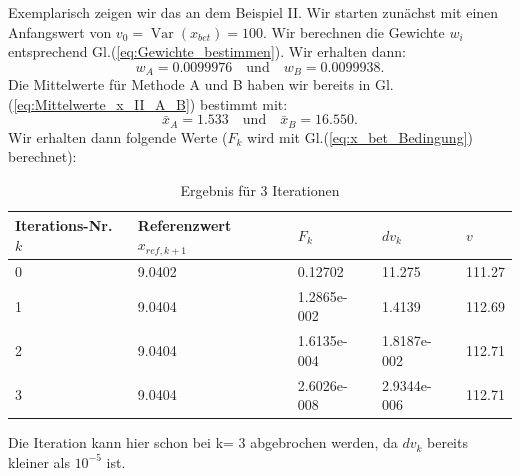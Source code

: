 Exemplarisch zeigen wir das an dem Beispiel II. 
Wir starten zunächst mit einen Anfangswert von $v_0 = \operatorname{Var}(x_{bet})=100$.
Wir berechnen die Gewichte $w_i$ entsprechend Gl.(\ref{eq:Gewichte_bestimmen}).
Wir erhalten dann:
\begin{equation}
w_A = 0.0099976 \quad \text{und} \quad w_B = 0.0099938.
\end{equation}
Die Mittelwerte für Methode A und B haben wir bereits in Gl.(\ref{eq:Mittelwerte_x_II_A_B}) bestimmt mit: 
\begin{equation}
\bar x_A = 1.533 \quad \text{und} \quad \bar x_B = 16.550.
\end{equation}
Wir erhalten dann folgende Werte ($F_k$ wird mit Gl.(\ref*{eq:x_bet_Bedingung}) berechnet):

\begin{table}[!htb]
	\caption{Ergebnis für 3 Iterationen}
	\begin{center}
		\begin{tabular}{p{2cm}| p{3.5cm} | p{3cm} |p{3cm}|p{2cm}}
			\hline 
			Iterations-Nr. $k$ & Referenzwert $x_{ref,k+1}$ & $F_{k}$ & $dv_k$ & $v$\\ \hline
			0 & 9.0402 & 0.12702 & 11.275 &  111.27\\ \hline
			1 & 9.0404 & 1.2865e-002 & 1.4139 & 112.69\\ \hline
			2 & 9.0404 & 1.6135e-004 & 1.8187e-002 & 112.71 \\ \hline
			3 & 9.0404 & 2.6026e-008 & 2.9344e-006 & 112.71 \\ \hline
		\end{tabular}
	\end{center}
	\label{tab:Iteration_von_Beispiel II}
\end{table}

Die Iteration kann hier schon bei k= 3 abgebrochen werden, da $dv_k$ bereits 
kleiner als $10^{-5}$ ist. 

